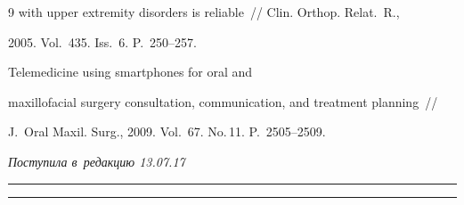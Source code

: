 {{\begin{thebibliography}{9}
with upper extremity disorders is reliable~/\!\!/  Clin. Orthop. Relat.~R., 


2005. Vol.~435. Iss.~6. P.~250--257.







 Telemedicine using smartphones for oral and 


maxillofacial surgery consultation, communication, and treatment planning~/\!\!/ 


J.~Oral Maxil. Surg., 2009. Vol.~67. No.\,11. P.~2505--2509.


        \end{thebibliography}


} }








\vspace*{-6pt}





\hfill{\small\textit{Поступила в~редакцию 13.07.17}}














\vspace*{4pt}





\hrule





\vspace*{2pt}















\hrule
















